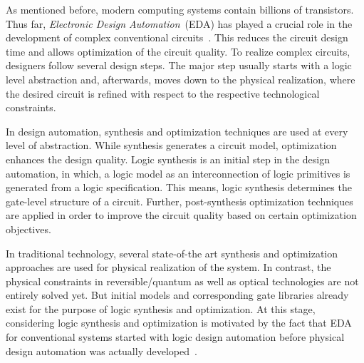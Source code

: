 \documentclass[10pt,letterpaper,twoside,openright]{book}
\begin{document}
As mentioned before, modern computing systems contain billions of transistors. Thus far, \emph{Electronic Design Automation}~(EDA) has played a crucial role in the development of complex conventional circuits~\cite{Jansen:2003}. This reduces the circuit design time and allows optimization of the circuit quality. To realize complex circuits, designers follow several design steps. The major step usually starts with a logic level abstraction and, afterwards, moves down to the physical realization, where the desired circuit is refined with respect to the respective technological constraints.  

In design automation, synthesis and optimization techniques are used at every level of abstraction. While synthesis generates a circuit model, optimization enhances the design quality. Logic synthesis is an initial step in the design automation, in which, a logic model as an interconnection of logic primitives is generated from a logic specification. This means, logic synthesis determines the gate-level structure of a circuit. Further, post-synthesis optimization techniques are applied in order to improve the circuit quality based on certain optimization objectives.

In traditional technology, several state-of-the art synthesis and optimization approaches are used for physical realization of the system. In contrast, the physical constraints in reversible/quantum as well as optical technologies are not entirely solved yet. But initial models and corresponding gate libraries already exist for the purpose of logic synthesis and optimization. At this stage, considering logic synthesis and optimization is motivated by the fact that EDA for conventional systems started with logic design automation before physical design automation was actually developed~\cite{Micheli:1994}.
   
\end{document}
